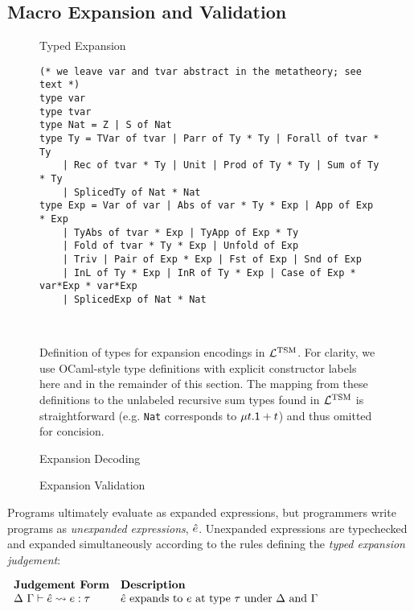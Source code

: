 {\subsection{Macro Expansion and Validation}
\begin{figure}
\caption{Typed Expansion}
\label{fig:u-typed-expansion}
\end{figure}
\begin{figure}
\begin{lstlisting}
(* we leave var and tvar abstract in the metatheory; see text *)
type var
type tvar
type Nat = Z | S of Nat
type Ty = TVar of tvar | Parr of Ty * Ty | Forall of tvar * Ty 
	| Rec of tvar * Ty | Unit | Prod of Ty * Ty | Sum of Ty * Ty
	| SplicedTy of Nat * Nat
type Exp = Var of var | Abs of var * Ty * Exp | App of Exp * Exp
	| TyAbs of tvar * Exp | TyApp of Exp * Ty
	| Fold of tvar * Ty * Exp | Unfold of Exp
	| Triv | Pair of Exp * Exp | Fst of Exp | Snd of Exp
	| InL of Ty * Exp | InR of Ty * Exp | Case of Exp * var*Exp * var*Exp
	| SplicedExp of Nat * Nat
\end{lstlisting}
\\
\caption[Expansion Encodings]{Definition of types for expansion encodings in $\mathcal{L}^\text{TSM}$. For clarity, we use OCaml-style type definitions with explicit constructor labels here and in the remainder of this section. The mapping from these definitions to the unlabeled recursive sum types found in $\mathcal{L}^\text{TSM}$ is straightforward (e.g. \texttt{Nat} corresponds to $\mu t.\mathsf{1} + t$) and thus omitted for concision.}
\label{fig:visible-compiler}
\end{figure}
\begin{figure}
\caption{Expansion Decoding}
\label{fig:u-expansion-decoding}
\end{figure}
\begin{figure}
\caption{Expansion Validation}
\label{fig:u-expansion-validation}
\end{figure}
Programs ultimately evaluate as expanded expressions, but programmers write programs as \emph{unexpanded expressions}, $\hat{e}$. Unexpanded expressions are typechecked and expanded simultaneously according to the rules defining the \emph{typed expansion judgement}:

$\begin{array}{ll}
\textbf{Judgement Form} & \textbf{Description}\\
\Delta~\Gamma \vdash \hat{e} \leadsto e : \tau & \text{$\hat{e}$ expands to $e$ at type $\tau$ under $\Delta$ and $\Gamma$}
\end{array}$

}
